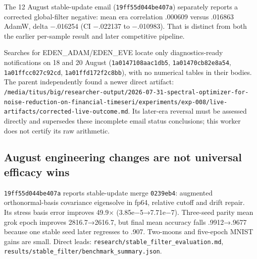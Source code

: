 \documentclass[
  british,
  10pt,
  a4paper,
]{article}
\begin{document}
The 12 August stable-\allowbreak{}update email
(\texttt{19ff55d044be\allowbreak{}407a}) separately reports a corrected
global-\allowbreak{}filter negative: mean era correlation .000609 versus
.016863 AdamW, delta −.016254 (CI −.022137 to −.010983). That is
distinct from both the earlier per-sample result and later competitive
pipeline.

Searches for EDEN\_\allowbreak{}ADAM/\allowbreak{}EDEN\_\allowbreak{}EVE
locate only diagnostics-\allowbreak{}ready notifications on 18 and 20
August (\texttt{1a0147108aac\allowbreak{}1db5},
\texttt{1a01470cb82e\allowbreak{}8a54},
\texttt{1a01ffcc027c\allowbreak{}92cd},
\texttt{1a01ffd172f2\allowbreak{}c8bb}), with no numerical tables in
their bodies. The parent independently found a newer direct artifact:
\texttt{/\allowbreak{}media/\allowbreak{}titus/\allowbreak{}big/\allowbreak{}researcher-\allowbreak{}output/\allowbreak{}2026-\allowbreak{}07-\allowbreak{}31-\allowbreak{}spectral-\allowbreak{}optimizer-\allowbreak{}for-\allowbreak{}noise-\allowbreak{}reduction-\allowbreak{}on-\allowbreak{}financial-\allowbreak{}timeseri/\allowbreak{}experiments/\allowbreak{}exp-\allowbreak{}008/\allowbreak{}live-\allowbreak{}artifacts/\allowbreak{}corrected-\allowbreak{}live-\allowbreak{}outcome.\allowbreak{}md}.
Its later-era reversal must be assessed directly and supersedes these
incomplete email status conclusions; this worker does not certify its
raw arithmetic.\allowbreak{}

\subsection{August engineering changes are not universal efficacy
wins}\label{email-evidence--august-engineering-changes-are-not-universal-efficacy-wins}

\texttt{19ff55d044be\allowbreak{}407a} reports
stable-\allowbreak{}update merge \texttt{0239eb4}: augmented
orthonormal-\allowbreak{}basis covariance eigensolve in fp64, relative
cutoff and drift repair. Its stress basis error improves 49.9×
(3.\allowbreak{}85e−5→7.\allowbreak{}71e−7).\allowbreak{} Three-seed
parity mean grok epoch improves
2816.\allowbreak{}7→2616.\allowbreak{}7,\allowbreak{} but final mean
accuracy falls .\allowbreak{}9912→.\allowbreak{}9677 because one stable
seed later regresses to .907. Two-moons and five-epoch MNIST gains are
small. Direct leads:
\texttt{research/\allowbreak{}stable\_\allowbreak{}filter\_\allowbreak{}evaluation.\allowbreak{}md},
\texttt{results/\allowbreak{}stable\_\allowbreak{}filter/\allowbreak{}benchmark\_\allowbreak{}summary.\allowbreak{}json}.
\end{document}
